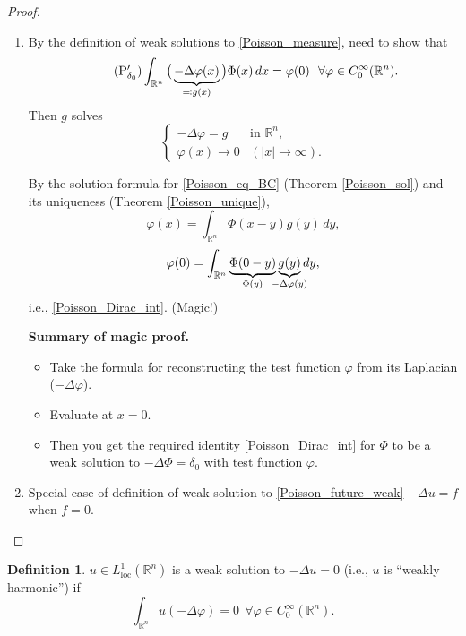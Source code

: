 \documentclass[12pt]{article}
\theoremstyle{definition}
\newtheorem*{definition*}{Definition}
\begin{document}
\begin{proof}
\begin{enumerate}[label=\alph*)]
\item By the definition of weak solutions to \eqref{Poisson_measure}, need to show that
\begin{equation}\tag{P$_{\delta_0}'$}\label{Poisson_Dirac_int}
\int_{\mathbb R^n}\big(\underbrace{-\Delta\varphi(x)}_{\eqqcolon g(x)}\big)\Phi(x)\,dx=\varphi(0)\ \ \forall\varphi\in C_0^\infty(\mathbb R^n).
\end{equation}
Then $g$ solves
\begin{equation}\tag{P}\label{Poisson_eq_BC}
\left\{\begin{array}{ll}-\Delta\varphi=g&\text{in }\mathbb R^n,\\\varphi(x)\rightarrow0&(|x|\to\infty).\end{array}\right.
\end{equation}

By the solution formula for \eqref{Poisson_eq_BC} (Theorem \ref{Poisson_sol}) and its uniqueness (Theorem \ref{Poisson_unique}),
\[\varphi(x)=\int_{\mathbb R^n}\Phi(x-y)g(y)\,dy,\]
\[\varphi(0)=\int_{\mathbb R^n}\underbrace{\Phi(0-y)}_{\Phi(y)}\underbrace{g(y)}_{\mathclap{-\Delta\varphi(y)}}dy,\]
i.e., \eqref{Poisson_Dirac_int}. (Magic!)

\textbf{Summary of magic proof.}

\begin{itemize}
\item Take the formula for reconstructing the test function $\varphi$ from its Laplacian ($-\Delta\varphi$).

\item Evaluate at $x=0$.

\item Then you get the required identity \eqref{Poisson_Dirac_int} for $\Phi$ to be a weak solution to $-\Delta\Phi=\delta_0$ with test function $\varphi$.
\end{itemize}

\item Special case of definition of weak solution to \eqref{Poisson_future_weak} $-\Delta u=f$ when $f=0$.
\end{enumerate}
\end{proof}

\begin{definition*}
$u\in L_\text{loc}^1(\mathbb R^n)$ is a weak solution to $-\Delta u=0$ (i.e., $u$ is ``weakly harmonic'') if
\[\int_{\mathbb R^n}u(-\Delta\varphi)=0\ \ \forall\varphi\in C_0^\infty(\mathbb R^n).\]
\end{definition*}
\end{document}
